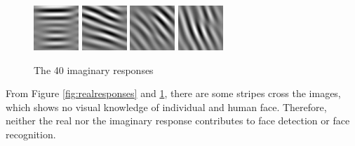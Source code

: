 \begin{figure}
\begin{center}
  \includegraphics[scale=0.5]{ch4/figures/imag_3_4.jpg}
  \includegraphics[scale=0.5]{ch4/figures/imag_3_5.jpg}
  \includegraphics[scale=0.5]{ch4/figures/imag_3_6.jpg}
  \includegraphics[scale=0.5]{ch4/figures/imag_3_7.jpg}
 \end{center}
\caption{The 40 imaginary responses}
\label{fig:imagresponses}
\end{figure} 

From \mbox{Figure} \ref{fig:realresponses} and \ref{fig:imagresponses}, there are some stripes cross the images, which shows no visual knowledge of individual and human face. Therefore, neither the real nor the imaginary response contributes to face detection or face recognition. 

